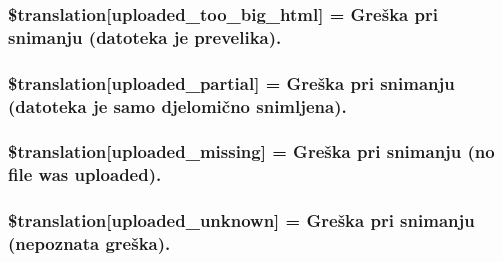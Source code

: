 \subsubsection[{\$translation}]{\setlength{\rightskip}{0pt plus 5cm}\$translation\mbox{[}\textquotesingle{}uploaded\+\_\+too\+\_\+big\+\_\+html\textquotesingle{}\mbox{]} = \textquotesingle{}Greška pri snimanju (datoteka je prevelika).\textquotesingle{}}\label{class_8upload_8hr___h_r_8php_a623d5b8b92169f57d7e43458aa911cbb}
\hypertarget{class_8upload_8hr___h_r_8php_a967c17da21b0a2d3bd65cca3a9ca0ea8}{}
\subsubsection[{\$translation}]{\setlength{\rightskip}{0pt plus 5cm}\$translation\mbox{[}\textquotesingle{}uploaded\+\_\+partial\textquotesingle{}\mbox{]} = \textquotesingle{}Greška pri snimanju (datoteka je samo djelomično snimljena).\textquotesingle{}}\label{class_8upload_8hr___h_r_8php_a967c17da21b0a2d3bd65cca3a9ca0ea8}
\hypertarget{class_8upload_8hr___h_r_8php_a0cce433260be65f1f35853a6b4b8952b}{}
\subsubsection[{\$translation}]{\setlength{\rightskip}{0pt plus 5cm}\$translation\mbox{[}\textquotesingle{}uploaded\+\_\+missing\textquotesingle{}\mbox{]} = \textquotesingle{}Greška pri snimanju (no file was uploaded).\textquotesingle{}}\label{class_8upload_8hr___h_r_8php_a0cce433260be65f1f35853a6b4b8952b}
\hypertarget{class_8upload_8hr___h_r_8php_a4a9168e922b827e6a28b5db1c00774ca}{}
\subsubsection[{\$translation}]{\setlength{\rightskip}{0pt plus 5cm}\$translation\mbox{[}\textquotesingle{}uploaded\+\_\+unknown\textquotesingle{}\mbox{]} = \textquotesingle{}Greška pri snimanju (nepoznata greška).\textquotesingle{}}\label{class_8upload_8hr___h_r_8php_a4a9168e922b827e6a28b5db1c00774ca}
\hypertarget{class_8upload_8hr___h_r_8php_a3afc377bd803683314f413a814243066}{}
